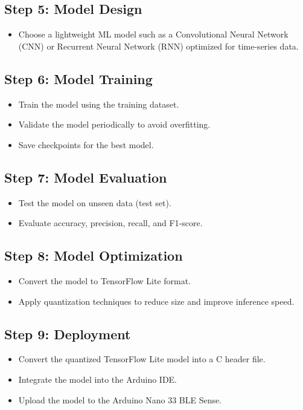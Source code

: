 \subsection{Step 5: Model Design}
\begin{itemize}
	\item Choose a lightweight ML model such as a Convolutional Neural Network (CNN) or Recurrent Neural Network (RNN) optimized for time-series data.
\end{itemize}

\subsection{Step 6: Model Training}
\begin{itemize}
	\item Train the model using the training dataset.
	\item Validate the model periodically to avoid overfitting.
	\item Save checkpoints for the best model.
\end{itemize}

\subsection{Step 7: Model Evaluation}
\begin{itemize}
	\item Test the model on unseen data (test set).
	\item Evaluate accuracy, precision, recall, and F1-score.
\end{itemize}

\subsection{Step 8: Model Optimization}
\begin{itemize}
	\item Convert the model to TensorFlow Lite format.
	\item Apply quantization techniques to reduce size and improve inference speed.
\end{itemize}

\subsection{Step 9: Deployment}
\begin{itemize}
	\item Convert the quantized TensorFlow Lite model into a C header file.
	\item Integrate the model into the Arduino IDE.
	\item Upload the model to the Arduino Nano 33 BLE Sense.
\end{itemize}

